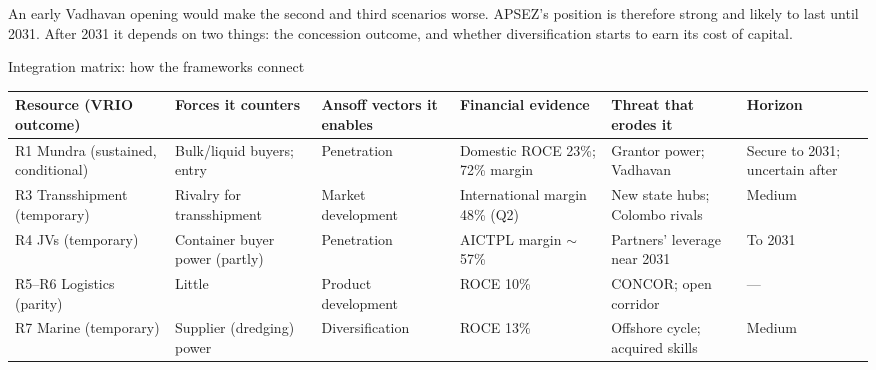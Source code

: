 \documentclass[12pt, a4paper]{article}
\newcommand{\tablesetup}{\footnotesize\renewcommand{\arraystretch}{1.25}\setlength{\tabcolsep}{4pt}}
\newcommand{\rowsep}{\addlinespace[3pt]}
\begin{document}
An early Vadhavan opening would make the second and third scenarios worse.
APSEZ's position is therefore strong and likely to last until 2031. After 2031
it depends on two things: the concession outcome, and whether diversification
starts to earn its cost of capital.

\begin{exhibit}[!htbp]
\caption{Integration matrix: how the frameworks connect}\label{ex:integration}
{\tablesetup
\begin{tabularx}{\linewidth}{P{29mm}LP{22mm}LLP{21mm}}
\toprule
\textbf{Resource (VRIO outcome)} & \textbf{Forces it counters} & \textbf{Ansoff vectors it enables} & \textbf{Financial evidence} & \textbf{Threat that erodes it} & \textbf{Horizon} \\
\midrule
R1 Mundra (sustained, conditional) & Bulk/liquid buyers; entry & Penetration & Domestic ROCE 23\%; 72\% margin & Grantor power; Vadhavan & Secure to 2031; uncertain after \\ \rowsep
R3 Transshipment (temporary) & Rivalry for transshipment & Market development & International margin 48\% (Q2) & New state hubs; Colombo rivals & Medium \\ \rowsep
R4 JVs (temporary) & Container buyer power (partly) & Penetration & AICTPL margin $\sim$57\% & Partners' leverage near 2031 & To 2031 \\ \rowsep
R5--R6 Logistics (parity) & Little & Product development & ROCE 10\% & CONCOR; open corridor & --- \\ \rowsep
R7 Marine (temporary) & Supplier (dredging) power & Diversification & ROCE 13\% & Offshore cycle; acquired skills & Medium \\
\bottomrule
\end{tabularx}}
\end{exhibit}
\end{document}
